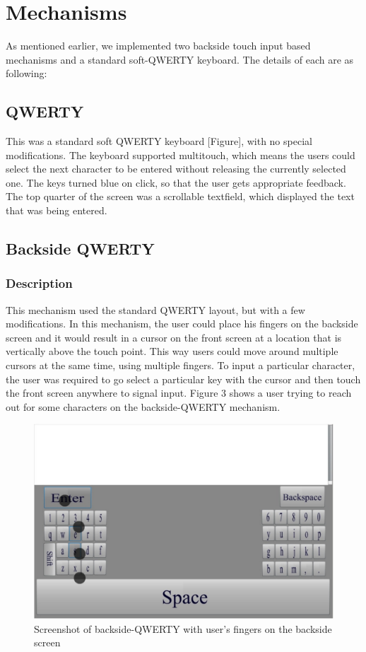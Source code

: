 \section{Mechanisms}

As mentioned earlier, we implemented two backside touch input based
mechanisms and a standard soft-QWERTY keyboard. The details of each
are as following:

\subsection{QWERTY}

This was a standard soft QWERTY keyboard [Figure], with no special
modifications. The keyboard supported multitouch, which means the
users could select the next character to be entered without releasing
the currently selected one. The keys turned blue on click, so that the
user gets appropriate feedback. The top quarter of the screen was a
scrollable textfield, which displayed the text that was being entered.

\subsection{Backside QWERTY}
\subsubsection{Description}

This mechanism used the standard QWERTY layout, but with a few
modifications. In this mechanism, the user could place his fingers on
the backside screen and it would result in a cursor on the front
screen at a location that is vertically above the touch point. This
way users could move around multiple cursors at the same time, using
multiple fingers. To input a particular character, the user was
required to go select a particular key with the cursor and then touch
the front screen anywhere to signal input. Figure 3 shows a user trying to reach out for some characters on the backside-QWERTY mechanism.

\begin{figure}
    \includegraphics[scale=0.45]{Figures/backside.pdf} 
    \caption{Screenshot of backside-QWERTY with user's fingers on the
      backside screen}
\end{figure}

